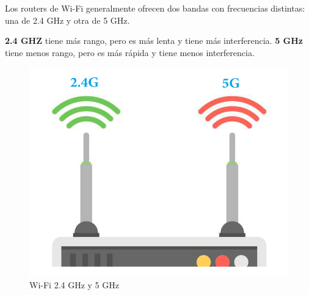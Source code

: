Los routers de Wi-Fi generalmente ofrecen dos bandas con frecuencias distintas: una de 2.4 GHz y otra de 5 GHz.

\textbf{2.4 GHZ} tiene más rango, pero es más lenta y tiene más interferencia. \textbf{5 GHz} tiene menos rango, pero es más rápida y tiene menos interferencia.

\begin{figure}[H]
  \centering
  \includegraphics[scale=0.3]{imagenes/wifi.png}
  \caption{Wi-Fi 2.4 GHz y 5 GHz\cite{utecwifi}}
\end{figure}

